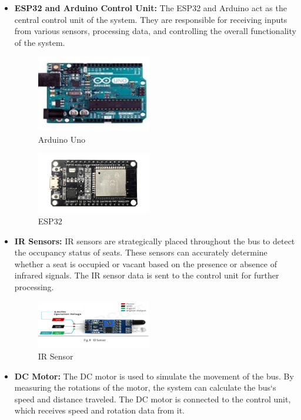 \documentclass[conference]{IEEEtran}
\begin{document}
  \begin{itemize}
    \item \textbf{ESP32 and Arduino Control Unit: } The ESP32 and Arduino act as the central control unit of the system. They are responsible for receiving inputs from various sensors, processing data, and controlling the overall functionality of the system.
    \begin{figure}[h]
        \centering
        \includegraphics[width=5cm]{uno.jpg} %
        \caption{Arduino Uno}
      \end{figure}
      \begin{figure}[h]
        \centering
        \includegraphics[width=5cm]{esp32.png} %
        \caption{ESP32}
      \end{figure}
      \item \textbf{IR Sensors: } IR sensors are strategically placed throughout the bus to detect the occupancy status of seats. These sensors can accurately determine whether a seat is occupied or vacant based on the presence or absence of infrared signals. The IR sensor data is sent to the control unit for further processing.
      \begin{figure}[h]
        \centering
        \includegraphics[width=5cm]{ir.png} %
        \caption{IR Sensor}
      \end{figure}
      \item \textbf{DC Motor: } The DC motor is used to simulate the movement of the bus. By measuring the rotations of the motor, the system can calculate the bus`s speed and distance traveled. The DC motor is connected to the control unit, which receives speed and rotation data from it.

\end{itemize}
\end{document}
